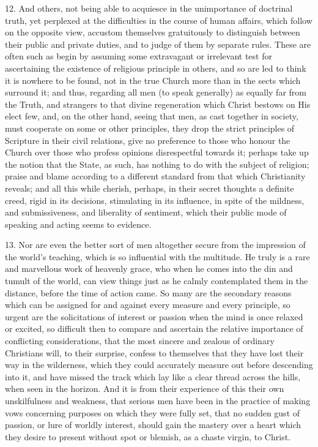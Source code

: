 12. And others, not being able to acquiesce in the unimportance of
doctrinal truth, yet perplexed at the difficulties in the course of
human affairs, which follow on the opposite view, accustom themselves
gratuitously to distinguish between their public and private duties,
and to judge of them by separate rules. These are often such as begin
by assuming some extravagant or irrelevant test for ascertaining the
existence of religious principle in others, and so are led to think it
is nowhere to be found, not in the true Church more than in the sects
which surround it; and thus, regarding all men (to speak generally) as
equally far from the Truth, and strangers to that divine regeneration
which Christ bestows on His elect few, and, on the other hand, seeing
that men, as cast together in society, must cooperate on some or other
principles, they drop the strict principles of Scripture in their
civil relations, give no preference to those who honour the Church
over those who profess opinions disrespectful towards it; perhaps take
up the notion that the State, as such, has nothing to do with the
subject of religion; praise and blame according to a different
standard from that which Christianity reveals; and all this while
cherish, perhaps, in their secret thoughts a definite creed, rigid in
its decisions, stimulating in its influence, in spite of the mildness,
and submissiveness, and liberality of sentiment, which their public
mode of speaking and acting seems to evidence.

13. Nor are even the better sort of men altogether secure from the
impression of the world's teaching, which is so influential with the
multitude. He truly is a rare and marvellous work of heavenly grace,
who when he comes into the din and tumult of the world, can view
things just as he calmly contemplated them in the distance, before the
time of action came. So many are the secondary reasons which can be
assigned for and against every measure and every principle, so urgent
are the solicitations of interest or passion when the mind is once
relaxed or excited, so difficult then to compare and ascertain the
relative importance of conflicting considerations, that the most
sincere and zealous of ordinary Christians will, to their surprise,
confess to themselves that they have lost their way in the wilderness,
which they could accurately measure out before descending into it, and
have missed the track which lay like a clear thread across the hills,
when seen in the horizon. And it is from their experience of this
their own unskilfulness and weakness, that serious men have been in
the practice of making vows concerning purposes on which they were
fully set, that no sudden gust of passion, or lure of worldly
interest, should gain the mastery over a heart which they desire to
present without spot or blemish, as a chaste virgin, to Christ.

